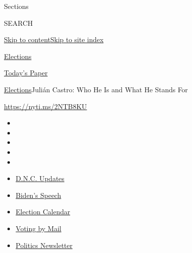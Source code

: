 Sections

SEARCH

\protect\hyperlink{site-content}{Skip to
content}\protect\hyperlink{site-index}{Skip to site index}

\href{https://www.nytimes3xbfgragh.onion/news-event/2020-election}{Elections}

\href{https://myaccount.nytimes3xbfgragh.onion/auth/login?response_type=cookie\&client_id=vi}{}

\href{https://www.nytimes3xbfgragh.onion/section/todayspaper}{Today's
Paper}

\href{/news-event/2020-election}{Elections}\textbar{}Julián Castro: Who
He Is and What He Stands For

\url{https://nyti.ms/2NTB8KU}

\begin{itemize}
\item
\item
\item
\item
\item
\end{itemize}

\begin{itemize}
\item
  \href{https://www.nytimes3xbfgragh.onion/live/2020/08/20/us/dnc-convention-election?action=click\&pgtype=Article\&state=default\&region=TOP_BANNER\&context=storylines_menu}{D.N.C.
  Updates}
\item
  \href{https://www.nytimes3xbfgragh.onion/2020/08/20/us/politics/biden-presidential-nomination-dnc.html?action=click\&pgtype=Article\&state=default\&region=TOP_BANNER\&context=storylines_menu}{Biden's
  Speech}
\item
  \href{https://www.nytimes3xbfgragh.onion/interactive/2019/us/elections/2020-presidential-election-calendar.html?action=click\&pgtype=Article\&state=default\&region=TOP_BANNER\&context=storylines_menu}{Election
  Calendar}
\item
  \href{https://www.nytimes3xbfgragh.onion/interactive/2020/08/11/us/politics/vote-by-mail-us-states.html?action=click\&pgtype=Article\&state=default\&region=TOP_BANNER\&context=storylines_menu}{Voting
  by Mail}
\item
  \href{https://www.nytimes3xbfgragh.onion/newsletters/politics?action=click\&pgtype=Article\&state=default\&region=TOP_BANNER\&context=storylines_menu}{Politics
  Newsletter}
\end{itemize}

